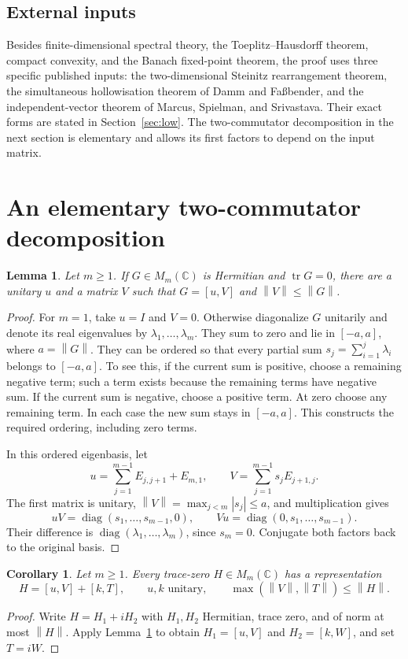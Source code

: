 \documentclass[11pt]{article}
\newtheorem{lemma}[theorem]{Lemma}
\newtheorem{corollary}[theorem]{Corollary}
\theoremstyle{remark}
\newcommand{\C}{\mathbb C}
\newcommand{\tr}{\operatorname{tr}}
\newcommand{\diag}{\operatorname{diag}}
\newcommand{\norm}[1]{\left\lVert#1\right\rVert}
\newcommand{\comm}[2]{[#1,#2]}
\numberwithin{equation}{section}
\begin{document}
\subsection{External inputs}
Besides finite-dimensional spectral theory, the Toeplitz--Hausdorff theorem,
compact convexity, and the Banach fixed-point theorem, the proof uses three
specific published inputs: the two-dimensional Steinitz rearrangement theorem,
the simultaneous hollowisation theorem of Damm and Fa\ss bender, and the
independent-vector theorem of Marcus, Spielman, and Srivastava. Their exact
forms are stated in Section~\ref{sec:low}.
The two-commutator decomposition in the next section is elementary and allows
its first factors to depend on the input matrix.

\section{An elementary two-commutator decomposition}\label{sec:sumtwo}
\begin{lemma}\label{lem:hermitian}
Let $m\ge1$. If $G\in M_m(\C)$ is Hermitian and $\tr G=0$, there are a unitary $u$ and a matrix
$V$ such that $G=\comm uV$ and $\norm V\le\norm G$.
\end{lemma}
\begin{proof}
For $m=1$, take $u=I$ and $V=0$. Otherwise diagonalize $G$ unitarily and denote
its real eigenvalues by $\lambda_1,\ldots,\lambda_m$. They sum to zero and lie in
$[-a,a]$, where $a=\norm G$. They can be ordered so that every partial sum
$s_j=\sum_{i=1}^j\lambda_i$ belongs to $[-a,a]$. To see this, if the current sum
is positive, choose a remaining negative term; such a term exists because the
remaining terms have negative sum. If the current sum is negative, choose a
positive term. At zero choose any remaining term. In each case the new sum
stays in $[-a,a]$. This constructs the required ordering, including zero terms.

In this ordered eigenbasis, let
\[
 u=\sum_{j=1}^{m-1}E_{j,j+1}+E_{m,1},\qquad
 V=\sum_{j=1}^{m-1}s_jE_{j+1,j}.
\]
The first matrix is unitary, $\norm V=\max_{j<m}|s_j|\le a$, and multiplication
gives
\[
 uV=\diag(s_1,\ldots,s_{m-1},0),\qquad
 Vu=\diag(0,s_1,\ldots,s_{m-1}).
\]
Their difference is $\diag(\lambda_1,\ldots,\lambda_m)$, since $s_m=0$.
Conjugate both factors back to the original basis.
\end{proof}

\begin{corollary}\label{cor:sumtwo}
Let $m\ge1$. Every trace-zero $H\in M_m(\C)$ has a representation
\begin{equation}\label{eq:sumtwo}
 H=\comm uV+\comm kT,\qquad
 u,k\text{ unitary},\qquad
 \max(\norm V,\norm T)\le\norm H.
\end{equation}
\end{corollary}
\begin{proof}
Write $H=H_1+iH_2$ with $H_1,H_2$ Hermitian, trace zero, and of norm at most
$\norm H$. Apply Lemma~\ref{lem:hermitian} to obtain
$H_1=\comm uV$ and $H_2=\comm kW$, and set $T=iW$.
\end{proof}
\end{document}
